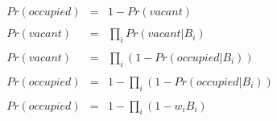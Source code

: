 \documentclass[11pt,a4paper]{article}
\author{Michael Firman}
\begin{document}
\begin{eqnarray}
Pr(occupied) &=& 1 - Pr(vacant)\\ 
&&\\
Pr(vacant) &=& \prod_{i} Pr(vacant | B_i )\\
&&\\
Pr(vacant) &=& \prod_{i} ( 1 - Pr(occupied | B_i ) ) \\
&&\\
Pr(occupied) &=& 1 - \prod_{i} ( 1 - Pr(occupied | B_i ) ) \\
&&\\
Pr(occupied) &=& 1 - \prod_{i} ( 1 - w_iB_i ) 
\end{eqnarray}
\end{document}
